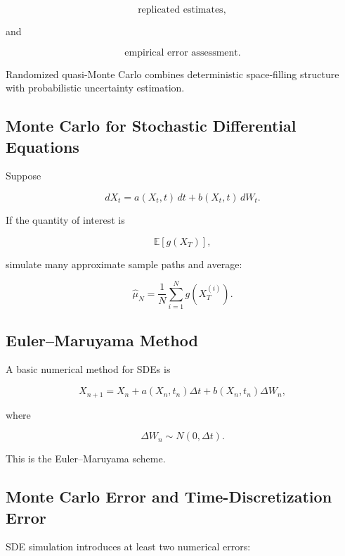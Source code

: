 \[
\boxed{
\text{replicated estimates},
}
\]

and

\[
\boxed{
\text{empirical error assessment}.
}
\]

Randomized quasi-Monte Carlo combines deterministic space-filling
structure with probabilistic uncertainty estimation.

\subsection{Monte Carlo for Stochastic Differential Equations}
\label{subsec:mc-sdes}

Suppose

\[
\boxed{
dX_t
=
a(X_t,t)\,dt
+
b(X_t,t)\,dW_t.
}
\]

If the quantity of interest is

\[
\boxed{
\mathbb{E}
[
g(X_T)
],
}
\]

simulate many approximate sample paths and average:

\[
\boxed{
\widehat{\mu}_N
=
\frac1N
\sum_{i=1}^{N}
g
(
X_T^{(i)}
).
}
\]

\subsection{Euler--Maruyama Method}
\label{subsec:euler-maruyama}

A basic numerical method for SDEs is

\[
\boxed{
X_{n+1}
=
X_n
+
a(X_n,t_n)\Delta t
+
b(X_n,t_n)\Delta W_n,
}
\]

where

\[
\boxed{
\Delta W_n
\sim
N(0,\Delta t).
}
\]

This is the Euler--Maruyama scheme.

\subsection{Monte Carlo Error and Time-Discretization Error}
\label{subsec:mc-sde-two-errors}

SDE simulation introduces at least two numerical errors:

